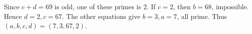 Since $c+d=69$ is odd, one of these primes is $2$. If $c=2$, then $b=68$, impossible. Hence $d=2,c=67$. The other equations give $b=3,a=7$, all prime. Thus $\boxed{(a,b,c,d)=(7,3,67,2)}$.
